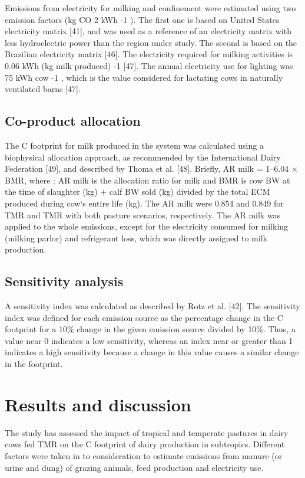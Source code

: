 \documentclass[11pt,a4paper]{article}
\begin{document}
Emissions from electricity for milking and confinement were estimated using two emission factors (kg CO 2 kWh -1 ). The first one is based on United States electricity matrix [41], and was used as a reference of an electricity matrix with less hydroelectric power than the region under study. The second is based on the Brazilian electricity matrix [46]. The electricity required for milking activities is 0.06 kWh (kg milk produced) -1 [47]. The annual electricity use for lighting was 75 kWh cow -1 , which is the value considered for lactating cows in naturally ventilated barns [47].

\subsection{Co-product allocation}

The C footprint for milk produced in the system was calculated using a biophysical allocation approach, as recommended by the International Dairy Federation [49], and described by Thoma et al. [48]. Briefly, AR milk = 1–6.04 × BMR, where : AR milk is the allocation ratio for milk and BMR is cow BW at the time of slaughter (kg) + calf BW sold (kg) divided by the total ECM produced during cow`s entire life (kg). The AR milk were 0.854 and 0.849 for TMR and TMR with both pasture scenarios, respectively. The AR milk was applied to the whole emissions, except for the electricity consumed for milking (milking parlor) and refrigerant loss, which was directly assigned to milk production.

\subsection{Sensitivity analysis}

A sensitivity index was calculated as described by Rotz et al. [42]. The sensitivity index was defined for each emission source as the percentage change in the C footprint for a 10\% change in the given emission source divided by 10\%. Thus, a value near 0 indicates a low sensitivity, whereas an index near or greater than 1 indicates a high sensitivity because a change in this value causes a similar change in the footprint.

\section{Results and discussion}

The study has assessed the impact of tropical and temperate pastures in dairy cows fed TMR on the C footprint of dairy production in subtropics. Different factors were taken in to consideration to estimate emissions from manure (or urine and dung) of grazing animals, feed production and electricity use.
\end{document}
